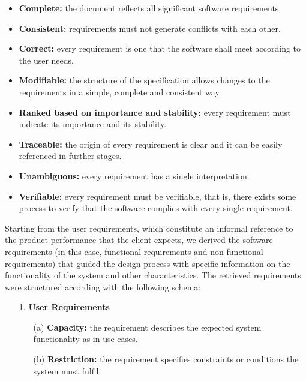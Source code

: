 \begin{itemize}

\item \textbf{Complete:} the document reflects all significant software requirements.

\item \textbf{Consistent:} requirements must not generate conflicts with each other.

\item \textbf{Correct:} every requirement is one that the software shall meet according to the user needs.

\item \textbf{Modifiable:} the structure of the specification allows changes to the requirements in a simple, complete and consistent way.

\item \textbf{Ranked based on importance and stability:} every requirement must indicate its importance and its stability.

\item \textbf{Traceable:} the origin of every requirement is clear and it can be easily referenced in further stages.

\item \textbf{Unambiguous:} every requirement has a single interpretation.

\item \textbf{Verifiable:} every requirement must be verifiable, that is, there exists some process to verify that the software complies with every single requirement.


\end{itemize}

Starting from the user requirements, which constitute an informal reference to the product performance that the client expects, we derived the software requirements (in this case, functional requirements and non-functional requirements) that guided the design process with specific information on the functionality of the system and other characteristics. The retrieved requirements were structured according with the following schema:

\begin{itemize}
\item[1.] \textbf{User Requirements} 
	\begin{itemize}
		\item[(a)] \textbf{Capacity:} the requirement describes the expected system functionality as in use cases.
		\item[(b)] \textbf{Restriction:} the requirement specifies constraints or conditions the system must fulfil.	
	\end{itemize}	
\end{itemize}

